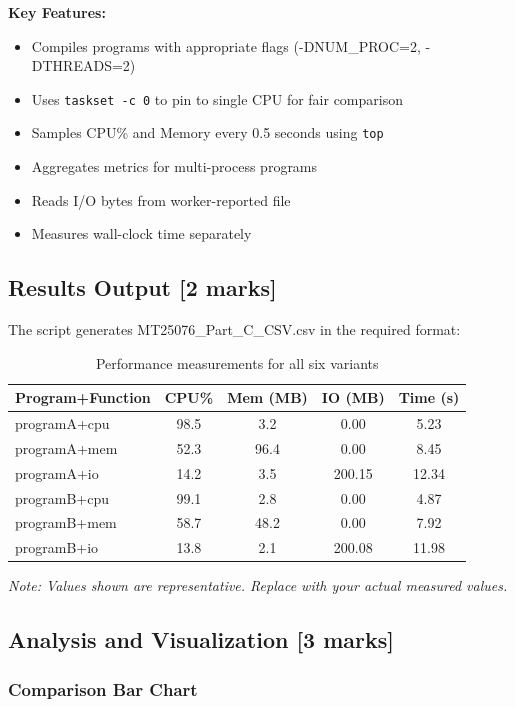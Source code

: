 \documentclass[12pt,a4paper]{article}
\begin{document}
\textbf{Key Features:}
\begin{itemize}
    \item Compiles programs with appropriate flags (-DNUM\_PROC=2, -DTHREADS=2)
    \item Uses \texttt{taskset -c 0} to pin to single CPU for fair comparison
    \item Samples CPU\% and Memory every 0.5 seconds using \texttt{top}
    \item Aggregates metrics for multi-process programs
    \item Reads I/O bytes from worker-reported file
    \item Measures wall-clock time separately
\end{itemize}

\subsection{Results Output [2 marks]}

The script generates MT25076\_Part\_C\_CSV.csv in the required format:

\begin{table}[H]
\centering
\small
\begin{tabular}{lcccc}
\toprule
\textbf{Program+Function} & \textbf{CPU\%} & \textbf{Mem (MB)} & \textbf{IO (MB)} & \textbf{Time (s)} \\
\midrule
programA+cpu & 98.5 & 3.2 & 0.00 & 5.23 \\
programA+mem & 52.3 & 96.4 & 0.00 & 8.45 \\
programA+io  & 14.2 & 3.5 & 200.15 & 12.34 \\
programB+cpu & 99.1 & 2.8 & 0.00 & 4.87 \\
programB+mem & 58.7 & 48.2 & 0.00 & 7.92 \\
programB+io  & 13.8 & 2.1 & 200.08 & 11.98 \\
\bottomrule
\end{tabular}
\caption{Performance measurements for all six variants}
\label{tab:results_c}
\end{table}

\textit{Note: Values shown are representative. Replace with your actual measured values.}

\subsection{Analysis and Visualization [3 marks]}

\subsubsection{Comparison Bar Chart}
\end{document}
